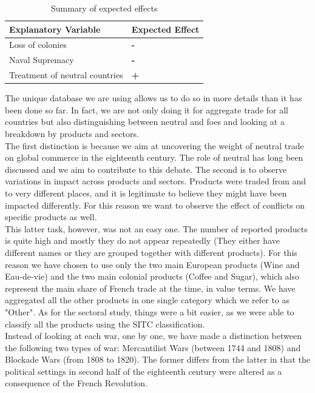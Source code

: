 \documentclass[12pt,a4paper,notitlepage,english]{article}
\begin{document}
\begin{table}[H]
\centering
\caption{Summary of expected effects}
\label{summary}
\begin{tabular}{ll}
\hline \hline
Explanatory Variable & Expected Effect  \\ \hline
Loss of colonies & \textbf{-}                  \\
Naval Supremacy & \textbf{-}                 \\
Treatment of neutral countries &       \textbf{+}      \\ \hline 
\end{tabular}
\end{table}



\iffalse
The unique database we are using allows us to do so in more details than it has been done so far.
In fact, we are not only doing it for aggregate trade for all countries but also distinguishing between neutral and foes and looking at a breakdown by products and sectors. \\
The first distinction is because we aim at uncovering the weight of neutral trade on global commerce in the eighteenth century.
The role of neutral has long been discussed and we aim to contribute to this debate.
The second is to observe variations in impact across products and sectors.
Products were traded from and to very different places, and it is legitimate to believe they might have been impacted differently.
For this reason we want to observe the effect of conflicts on specific products as well.\\
This latter task, however, was not an easy one.
The number of reported products is quite high and mostly they do not appear repeatedly (They either have different names or they are grouped together with different products).
For this reason we have chosen to use only the two main European products (Wine and Eau-de-vie) and the two main colonial products (Coffee and Sugar), which also represent the main share of French trade at the time, in value terms.
We have aggregated all the other products in one single category which we refer to as "Other".
As for the sectoral study, things were a bit easier, as we were able to classify all the products using the SITC classification.\\
Instead of looking at each war, one by one, we have made a distinction between the following two types of war: Mercantilist Wars (between 1744 and 1808) and Blockade Wars (from 1808 to 1820).
The former differs from the latter in that the political settings in second half of the eighteenth century were altered as a consequence of the French Revolution.
\end{document}
